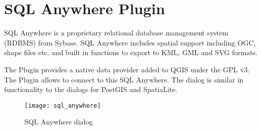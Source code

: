 
\section{SQL Anywhere Plugin}\label{sec:sqlanywhere}


SQL Anywhere is a proprietary relational database management system (RDBMS) 
from Sybase. SQL Anywhere includes spatial support including OGC, shape files 
etc. and built in functions to export to KML, GML and SVG formats.

The  Plugin provides a native data provider 
added to QGIS under the GPL v3. The Plugin allows to connect to this SQL 
Anywhere. The  dialog is similar in functionality 
to the dialogs for PostGIS and SpatiaLite.

\begin{figure}[ht]
   \centering
   \texttt{[image: sql\_anywhere]}
   \caption{SQL Anywhere dialog \nixcaption}
   \label{fig:sqlanywhere}
\end{figure}


\FloatBarrier
